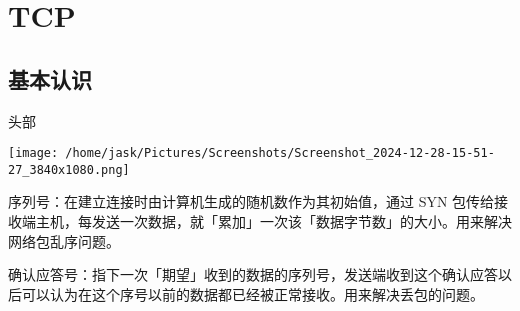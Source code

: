 \documentclass[11pt]{article}
\begin{document}
\section{TCP}
\label{sec:orgc06f585}
\subsection{基本认识}
\label{sec:org6f89bb8}
头部
\begin{center}
\texttt{[image: /home/jask/Pictures/Screenshots/Screenshot\_2024-12-28-15-51-27\_3840x1080.png]}
\end{center}
序列号：在建立连接时由计算机生成的随机数作为其初始值，通过 SYN 包传给接收端主机，每发送一次数据，就「累加」一次该「数据字节数」的大小。用来解决网络包乱序问题。

确认应答号：指下一次「期望」收到的数据的序列号，发送端收到这个确认应答以后可以认为在这个序号以前的数据都已经被正常接收。用来解决丢包的问题。
\end{document}
